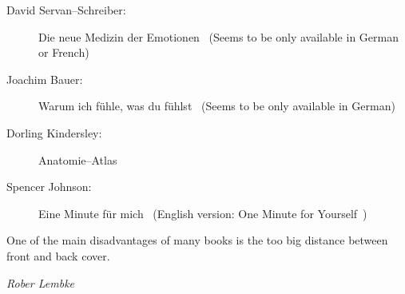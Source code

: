 \documentclass[../main.tex]{subfiles}
\begin{document}
\begin{description}
\item[David Servan--Schreiber:] Die neue Medizin der Emotionen~\cite{MedEmotionen} (Seems to be only available in German or French)
\item[Joachim Bauer:] Warum ich f\"uhle, was du f\"uhlst~\cite{BauerFuehlen} (Seems to be only available in German)
  \item[Dorling Kindersley:] Anatomie--Atlas~\cite{DorlingAtlas}
\item[Spencer Johnson:] Eine Minute f\"ur mich~\cite{Minutemich} (English version: One Minute for Yourself~\cite{MinutemichE})
\end{description}

\epigraph{One of the main disadvantages of many books is the too big distance between front and back cover.}{\textit{Rober Lembke}}
\end{document}
